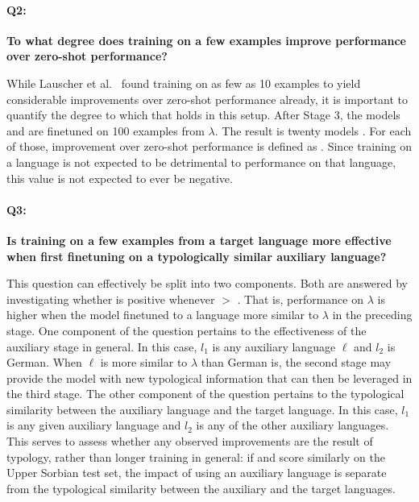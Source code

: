 			\paragraph{Q2:} \textbf{To what degree does training on a few examples improve performance over zero-shot performance?}
			
				\noindent While Lauscher et al.~\cite{lauscher-etal-2020-zero} found training on as few as 10 examples to yield considerable improvements over zero-shot performance already, it is important to quantify the degree to which that holds in this setup. After Stage 3, the models  and \m{$\ell$} are finetuned on 100 examples from $\lambda$. The result is twenty models . For each of those, improvement over zero-shot performance is defined as . Since training on a language is not expected to be detrimental to performance on that language, this value is not expected to ever be negative.

			\paragraph{Q3:} \textbf{Is training on a few examples from a target language more effective when first finetuning on a typologically similar auxiliary language?}

				\noindent This question can effectively be split into two components. Both are answered by investigating whether  is positive whenever  $>$ . That is, performance on $\lambda$ is higher when the model finetuned to a language more similar to $\lambda$ in the preceding stage. One component of the question pertains to the effectiveness of the auxiliary stage in general. In this case, $l_1$ is any auxiliary language $\ell$ and $l_2$ is German. When $\ell$ is more similar to $\lambda$ than German is, the second stage may provide the model with new typological information that can then be leveraged in the third stage. The other component of the question pertains to the typological similarity between the auxiliary language and the target language. In this case, $l_1$ is any given auxiliary language and $l_2$ is any of the other auxiliary languages. This serves to assess whether any observed improvements are the result of typology, rather than longer training in general: if  and  score similarly on the Upper Sorbian test set, the impact of using an auxiliary language is separate from the typological similarity between the auxiliary and the target languages.

